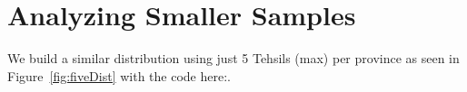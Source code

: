 \section{Analyzing Smaller Samples}
\label{sec:smallerDist}




We build a similar distribution using just 5 Tehsils (max) per province as seen in Figure~\ref{fig:fiveDist} with the code here:.
\begin{knitrout}
\color{fgcolor}\begin{kframe}
\begin{flushleft}
\ttfamily\noindent
{}\hlassignement{\usebox{\hlnormalsizeboxlessthan}-}{\ }\hlkeyword{[}\hlkeyword{\usebox{\hlnormalsizeboxdollar}}\hlkeyword{(}\hlkeyword{(}\hlkeyword{,}{\ }\hlargument{=}{\ }\hlkeyword{,}\hspace*{\fill}\\
\hlstd{}{\ }{\ }{\ }{\ }\hlargument{=}{\ }\hlkeyword{,}{\ }\hlargument{=}{\ }\hlkeyword{,}{\ }\hlargument{=}{\ }\hlkeyword{)}\hlkeyword{)}\hlkeyword{,}{\ }\hlkeyword{]}\hspace*{\fill}\\
\hlstd{}\hlkeyword{\usebox{\hlnormalsizeboxdollar}}\hlassignement{\usebox{\hlnormalsizeboxlessthan}-}{\ }\hlkeyword{(}\hlkeyword{\usebox{\hlnormalsizeboxdollar}}\hlkeyword{)}\hspace*{\fill}\\
\hlstd{}\hlassignement{\usebox{\hlnormalsizeboxlessthan}-}{\ }\hlkeyword{(}\hlargument{=}{\ }\hlkeyword{,}{\ }\hlargument{=}{\ }\hlkeyword{,}{\ }\hlargument{=}{\ }\hlkeyword{,}\hspace*{\fill}\\
\hlstd{}{\ }{\ }{\ }{\ }\hlargument{=}{\ }\hlkeyword{)}\hspace*{\fill}\\

\end{flushleft}
\end{kframe}
\end{knitrout}
